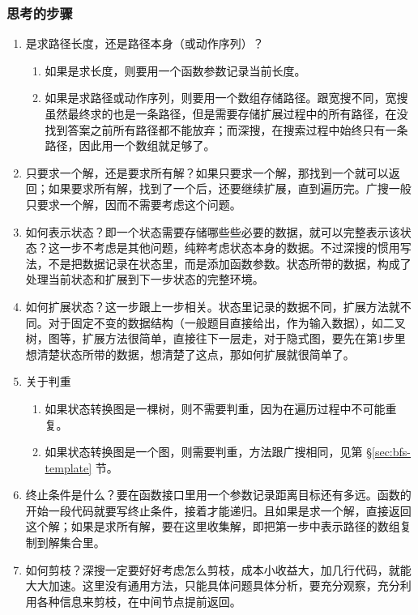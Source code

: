 \subsubsection{思考的步骤}
\begin{enumerate}
\item 是求路径长度，还是路径本身（或动作序列）？
    \begin{enumerate}
    \item 如果是求长度，则要用一个函数参数记录当前长度。
    \item 如果是求路径或动作序列，则要用一个数组存储路径。跟宽搜不同，宽搜虽然最终求的也是一条路径，但是需要存储扩展过程中的所有路径，在没找到答案之前所有路径都不能放弃；而深搜，在搜索过程中始终只有一条路径，因此用一个数组就足够了。
    \end{enumerate}
\item 只要求一个解，还是要求所有解？如果只要求一个解，那找到一个就可以返回；如果要求所有解，找到了一个后，还要继续扩展，直到遍历完。广搜一般只要求一个解，因而不需要考虑这个问题。
\item 如何表示状态？即一个状态需要存储哪些些必要的数据，就可以完整表示该状态？这一步不考虑是其他问题，纯粹考虑状态本身的数据。不过深搜的惯用写法，不是把数据记录在状态里，而是添加函数参数。状态所带的数据，构成了处理当前状态和扩展到下一步状态的完整环境。
\item 如何扩展状态？这一步跟上一步相关。状态里记录的数据不同，扩展方法就不同。对于固定不变的数据结构（一般题目直接给出，作为输入数据），如二叉树，图等，扩展方法很简单，直接往下一层走，对于隐式图，要先在第1步里想清楚状态所带的数据，想清楚了这点，那如何扩展就很简单了。
\item 关于判重
    \begin{enumerate}
    \item 如果状态转换图是一棵树，则不需要判重，因为在遍历过程中不可能重复。
    \item 如果状态转换图是一个图，则需要判重，方法跟广搜相同，见第 \S \ref{sec:bfs-template} 节。
    \end{enumerate}
\item 终止条件是什么？要在函数接口里用一个参数记录距离目标还有多远。函数的开始一段代码就要写终止条件，接着才能递归。且如果是求一个解，直接返回这个解；如果是求所有解，要在这里收集解，即把第一步中表示路径的数组复制到解集合里。
\item 如何剪枝？深搜一定要好好考虑怎么剪枝，成本小收益大，加几行代码，就能大大加速。这里没有通用方法，只能具体问题具体分析，要充分观察，充分利用各种信息来剪枝，在中间节点提前返回。
\end{enumerate}


